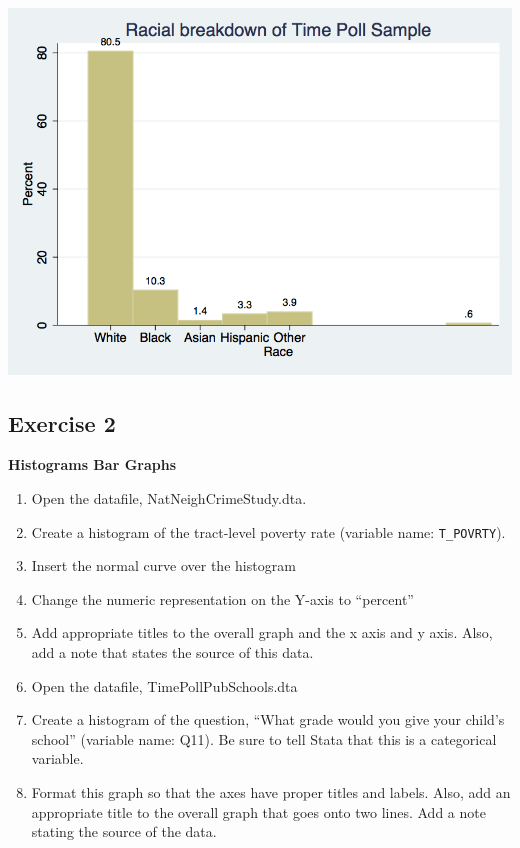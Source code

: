 \documentclass[
]{book}
\providecommand{\tightlist}{%
  \setlength{\itemsep}{0pt}\setlength{\parskip}{0pt}}
\begin{document}
\includegraphics{Stata/StataModGraph/images/bargraph.png}

\hypertarget{exercise-2-6}{%
\subsection{Exercise 2}\label{exercise-2-6}}

\textbf{Histograms Bar Graphs}

\begin{enumerate}
\def\labelenumi{\arabic{enumi}.}
\tightlist
\item
  Open the datafile, NatNeighCrimeStudy.dta.
\item
  Create a histogram of the tract-level poverty rate (variable name: \texttt{T\_POVRTY}).
\item
  Insert the normal curve over the histogram
\item
  Change the numeric representation on the Y-axis to ``percent''
\item
  Add appropriate titles to the overall graph and the x axis and y axis. Also, add a note that states the source of this data.
\item
  Open the datafile, TimePollPubSchools.dta
\item
  Create a histogram of the question, ``What grade would you give your child's school'' (variable name: Q11). Be sure to tell Stata that this is a categorical variable.
\item
  Format this graph so that the axes have proper titles and labels. Also, add an appropriate title to the overall graph that goes onto two lines. Add a note stating the source of the data.
\end{enumerate}
\end{document}
